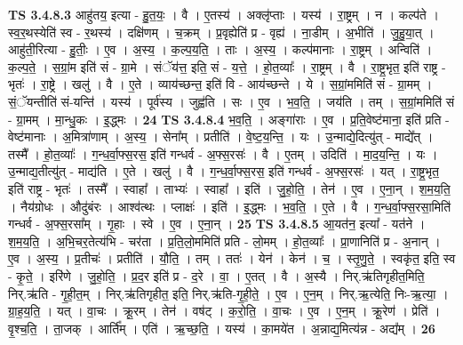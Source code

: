 \documentclass[17pt]{extarticle}
\begin{document}
                  \newline
                                \textbf{ TS 3.4.8.3} \newline
                  आहु॑तय॒ इत्या - हु॒त॒यः॒ । वै । ए॒तस्य॑ । अक्लृ॑प्ताः । यस्य॑ । रा॒ष्ट्रम् । न । कल्प॑ते । स्व॒र॒थस्येति॑ स्व - र॒थस्य॑ । दक्षि॑णम् । च॒क्रम् । प्र॒वृह्येति॑ प्र - वृह्य॑ । ना॒डीम् । अ॒भीति॑ । जु॒हु॒या॒त् । आहु॑ती॒रित्या - हु॒तीः॒ । ए॒व । अ॒स्य॒ । क॒ल्प॒य॒ति॒ । ताः । अ॒स्य॒ । कल्प॑मानाः । रा॒ष्ट्रम् । अन्विति॑ । क॒ल्प॒ते॒ । स॒ग्रां॒म इति॑ सं - ग्रा॒मे । संॅय॑त्त॒ इति॒ सं - य॒त्ते॒ । हो॒त॒व्याः᳚ । रा॒ष्ट्रम् । वै । रा॒ष्ट्र॒भृत॒ इति॑ राष्ट्र - भृतः॑ । रा॒ष्ट्रे । खलु॑ । वै । ए॒ते । व्याय॑च्छन्त॒ इति॑ वि - आय॑च्छन्ते । ये । स॒ग्रां॒ममिति॑ सं - ग्रा॒मम् । सं॒ॅयन्तीति॑ सं-यन्ति॑ । यस्य॑ । पूर्व॑स्य । जुह्व॑ति । सः । ए॒व । भ॒व॒ति॒ । जय॑ति । तम् । स॒ग्रां॒ममिति॑ सं - ग्रा॒मम् । मा॒न्धु॒कः । इ॒द्ध्मः । \textbf{  24} \newline
                  \newline
                                \textbf{ TS 3.4.8.4} \newline
                  भ॒व॒ति॒ । अङ्गा॑राः । ए॒व । प्र॒ति॒वेष्ट॑माना॒ इति॑ प्रति - वेष्ट॑मानाः । अ॒मित्रा॑णाम् । अ॒स्य॒ । सेना᳚म् । प्रतीति॑ । वे॒ष्ट॒य॒न्ति॒ । यः । उ॒न्माद्ये॒दित्यु॑त् - माद्ये᳚त् । तस्मै᳚ । हो॒त॒व्याः᳚ । ग॒न्ध॒र्वा॒फ्स॒रस॒ इति॑ गन्धर्व - अ॒फ्स॒रसः॑ । वै । ए॒तम् । उदिति॑ । मा॒द॒य॒न्ति॒ । यः । उ॒न्माद्य॒तीत्यु॑त् - माद्य॑ति । ए॒ते । खलु॑ । वै । ग॒न्ध॒र्वा॒फ्स॒रस॒ इति॑ गन्धर्व - अ॒फ्स॒रसः॑ । यत् । रा॒ष्ट्र॒भृत॒ इति॑ राष्ट्र - भृतः॑ । तस्मै᳚ । स्वाहा᳚ । ताभ्यः॑ । स्वाहा᳚ । इति॑ । जु॒हो॒ति॒ । तेन॑ । ए॒व । ए॒ना॒न् । श॒म॒य॒ति॒ । नैय॑ग्रोधः । औदु॑बंरः । आश्व॑त्थः । प्लाक्षः॑ । इति॑ । इ॒द्ध्मः । भ॒व॒ति॒ । ए॒ते । वै । ग॒न्ध॒र्वा॒फ्स॒रसा॒मिति॑ गन्धर्व - अ॒फ्स॒रसा᳚म् । गृ॒हाः । स्वे । ए॒व । ए॒ना॒न् । \textbf{  25} \newline
                  \newline
                                \textbf{ TS 3.4.8.5} \newline
                  आ॒यत॑न॒ इत्या᳚ - यत॑ने । श॒म॒य॒ति॒ । अ॒भि॒चर॒तेत्य॑भि - चर॑ता । प्र॒ति॒लो॒ममिति॑ प्रति - लो॒मम् । हो॒त॒व्याः᳚ । प्रा॒णानिति॑ प्र - अ॒नान् । ए॒व । अ॒स्य॒ । प्र॒तीचः॑ । प्रतीति॑ । यौ॒ति॒ । तम् । ततः॑ । येन॑ । केन॑ । च॒ । स्तृ॒णु॒ते॒ । स्वकृ॑त॒ इति॒ स्व - कृ॒ते॒ । इरि॑णे । जु॒हो॒ति॒ । प्र॒द॒र इति॑ प्र - द॒रे । वा॒ । ए॒तत् । वै । अ॒स्यै । निर्.ऋ॑तिगृहीत॒मिति॒ निर्.ऋ॑ति - गृ॒ही॒त॒म् । निर्.ऋ॑तिगृहीत॒ इति॒ निर्.ऋ॑ति-गृ॒ही॒ते॒ । ए॒व । ए॒न॒म् । निर्.ऋ॒त्येति॒ निः-ऋ॒त्या॒ । ग्रा॒ह॒य॒ति॒ । यत् । वा॒चः । क्रू॒रम् । तेन॑ । वष॑ट् । क॒रो॒ति॒ । वा॒चः । ए॒व । ए॒न॒म् । क्रू॒रेण॑ । प्रेति॑ । वृ॒श्च॒ति॒ । ता॒जक् । आर्ति᳚म् । एति॑ । ऋ॒च्छ॒ति॒ । यस्य॑ । का॒मये॑त । अ॒न्नाद्य॒मित्य॑न्न - अद्य᳚म् । \textbf{  26} \newline
\end{document}

